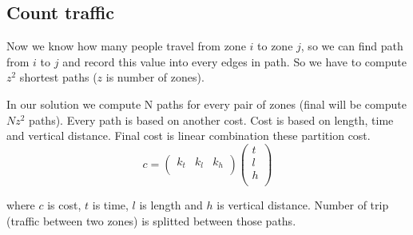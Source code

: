 \subsection{Count traffic}
Now we know how many people travel from zone $i$ to zone $j$, so we can find path from $i$ to $j$ and 
record this value into every edges in path. So we have to compute $z^2$ shortest paths ($z$ is number of zones).

In our solution we compute N paths for every pair of zones (final will be compute $N z^2$ paths). Every path is based on another cost. Cost is based on length, time and vertical distance. Final cost is linear combination these partition cost.
$$c = \left(\begin{array}{ccc}
k_t & k_l & k_h\\
\end{array}\right) \left( \begin{array}{c}
t\\
l\\
h\\
\end{array} \right)$$

where $c$ is cost, $t$ is time, $l$ is length and $h$ is vertical distance. Number of trip (traffic between two zones) is splitted between those paths.